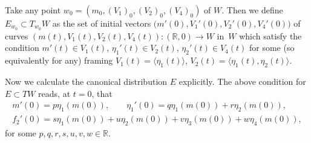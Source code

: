 \documentclass[pdftex]{sigma}
\numberwithin{equation}{section}
\theoremstyle{definition}
\newcommand{\R}{\mathbb{R}}
\newcommand{\0}{\boldsymbol{0}}
\begin{document}
Take any point $w_0 = (m_0, (V_1)_0, (V_2)_0, (V_4)_0)$ of $W$. Then
we define $E_{w_0} \subset T_{w_0}W$ as the set of initial vectors
$
\bigl(m'(0), V_1'(0), V_2'(0), V_4'(0)\bigr)
$
of curves $(m(t), V_1(t), V_2(t), V_4(t)) \colon (\R, 0) \to W$ in~$W$ which satisfy the condition
$m'(t) \in V_1(t)$, $\eta_1'(t) \in V_2(t)$, $\eta_2'(t) \in V_4(t)$ for some (so equivalently for any) framing
$V_1(t) = \langle \eta_1(t)\rangle$, $V_2(t) = \langle \eta_1(t), \eta_2(t)\rangle$.

Now we calculate the canonical distribution $E$ explicitly.
The above condition for $E \subset TW$ reads, at $t = 0$, that
\begin{gather*}
m'(0) = p \eta_1(m(0)), \qquad \eta_1'(0) = q \eta_1(m(0)) + r \eta_2(m(0)),
\\
f_2'(0) = s \eta_1(m(0)) + u \eta_2(m(0)) + v \eta_3(m(0)) + w \eta_4(m(0)),
\end{gather*}
for some $p, q, r, s, u, v, w \in \R$.
\end{document}
